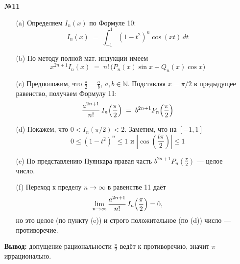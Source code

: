 \documentclass[a4paper]{article}
\renewcommand{\f}[2]{\frac{#1}{#2}}
\renewcommand{\leq}{\leqslant}
\begin{document}
\begin{enumerate}
  \item[\textbf{№11}]
  \begin{enumerate}
    \item[(a)]Определяем $I_n(x)$ по Формуле 10:
    \[
    I_n(x) \;=\;\int_{-1}^{1}(1 - t^2)^n\cos(xt)\,dt 
    \]
    \item[(b)]По методу полной мат. индукции имеем
    \[
    x^{2n+1}I_n(x) \;=\; n!\,\bigl(P_n(x)\sin x + Q_n(x)\cos x\bigr)
    \]
    \item[(c)]Предположим, что \(\displaystyle\frac\pi2=\frac ab\), \(a,b\in\mathbb N\). 
    Подставляя $x=\pi/2$ в предыдущее равенство, получаем Формулу 11:
    \[
    \frac{a^{2n+1}}{n!}\,I_n\Bigl(\frac\pi2\Bigr)
    \;=\;b^{2n+1}P_n\Bigl(\frac\pi2\Bigr)
    \]
    \item[(d)]Покажем, что $0< I_n(\pi/2)<2$. Заметим, что на $[-1,1]$
    $$\text{$0\leq (1-t^2)^n\leq 1$ и $|\cos(\f{t\pi}{2})|\leq 1$}$$

    \item[(e)]По представлению Пуянкара правая часть $b^{2n+1}P_n(\f{\pi}{2})$ --- целое число.

    \item[(f)]Переход к пределу $n \to \infty$ в равенстве 11 даёт
    \[
    \lim_{n\to\infty}\frac{a^{2n+1}}{n!}\,I_n\Bigl(\frac\pi2\Bigr)=0,
    \]
    но это целое (по пункту (e)) и строго положительное (по (d)) число — противоречие.
  \end{enumerate}
  \textbf{Вывод:} допущение рациональности $\f{\pi}{2}$ ведёт к противоречию, значит $\pi$ иррационально.
\end{enumerate}
\end{document}
